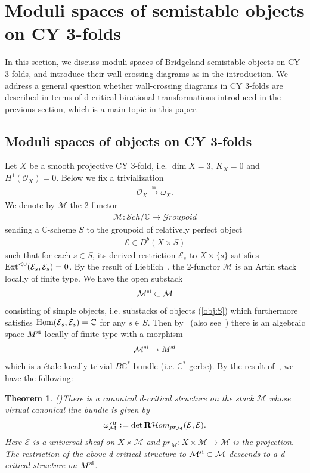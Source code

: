 \documentclass[11pt]{amsart}
\theoremstyle{plain}
\newtheorem{thm}{Theorem}[section]
\theoremstyle{definition}
\theoremstyle{remark}
\newcommand{\eE}{\mathcal{E}}
\newcommand{\gG}{\mathcal{G}}
\newcommand{\hH}{\mathcal{H}}
\newcommand{\mM}{\mathcal{M}}
\newcommand{\oO}{\mathcal{O}}
\newcommand{\sS}{\mathcal{S}}
\newcommand{\Hom}{\mathop{\rm Hom}\nolimits}
\newcommand{\dR}{\mathbf{R}}
\newcommand{\Ext}{\mathop{\rm Ext}\nolimits}
\begin{document}
\section{Moduli spaces of semistable objects on CY 3-folds}
\label{sec:moduliCY3}
In this section, we discuss moduli spaces of 
Bridgeland semistable objects on CY 3-folds, and 
introduce their wall-crossing diagrams as in 
the introduction. We address 
a general question 
whether wall-crossing diagrams 
in CY 3-folds
are described in terms of d-critical 
birational transformations introduced in the previous 
section, which is a main topic in this paper. 

\subsection{Moduli spaces of objects on CY 3-folds}
\label{subsec:moduli:general}
Let $X$ be a smooth projective CY 3-fold, i.e.
$\dim X=3$, $K_X=0$
and $H^1(\oO_X)=0$. 
Below we fix a trivialization
\begin{align}\label{trivialization}
\oO_X \stackrel{\cong}{\to} \omega_X.
\end{align}
We denote by $\mM$ the 2-functor
\begin{align*}
\mM \colon \sS ch/\mathbb{C} \to 
\gG roupoid
\end{align*}
sending a 
$\mathbb{C}$-scheme $S$ to the groupoid
of relatively perfect object 
\begin{align}\label{obj:S}
\eE \in D^b(X \times S)
\end{align}
such that 
for each $s \in S$, 
its derived 
restriction $\eE_s$
to $X \times \{s\}$
satisfies 
$\Ext^{<0}(\eE_s, \eE_s)=0$. 
By the result of Lieblich~\cite{LIE}, 
the 2-functor $\mM$ 
is an Artin stack locally of finite type. 
We have the open substack
\begin{align*}
\mM^{\rm{si}} \subset \mM
\end{align*}
consisting of 
simple objects, i.e. 
substacks of objects (\ref{obj:S})
which furthermore satisfies $\Hom(\eE_s, \eE_s)=\mathbb{C}$
for any $s \in S$. 
Then by~\cite[Corollary~4.3.3]{LIE}
(also see~\cite{Inaba})
there is an algebraic space 
$M^{\rm{si}}$ locally of finite type with a morphism
\begin{align}\label{M:simple}
\mM^{\rm{si}} \to M^{\rm{si}}
\end{align}
which is a \'etale locally trivial 
$B\mathbb{C}^{\ast}$-bundle
(i.e. $\mathbb{C}^{\ast}$-gerbe). 
By the result of~\cite{MR3352237},
we have the following: 
\begin{thm}\emph{(\cite{MR3352237})}\label{thm:CYdcrit}
There is a canonical d-critical structure 
on the stack $\mM$ whose virtual
canonical line bundle is given by
\begin{align}\label{vir:K}
\omega_{\mM}^{\rm{vir}} \cneq 
\det \dR \hH om_{pr_{\mM}}(\eE, \eE). 
\end{align} 
Here $\eE$ is a universal sheaf on $X \times \mM$ and 
$pr_{\mM} \colon X \times \mM
 \to \mM$ is the projection. 
The restriction of the above d-critical structure 
to $\mM^{\rm{si}} \subset \mM$ 
descends to a d-critical 
structure on $M^{\rm{si}}$. 
\end{thm}
\end{document}
